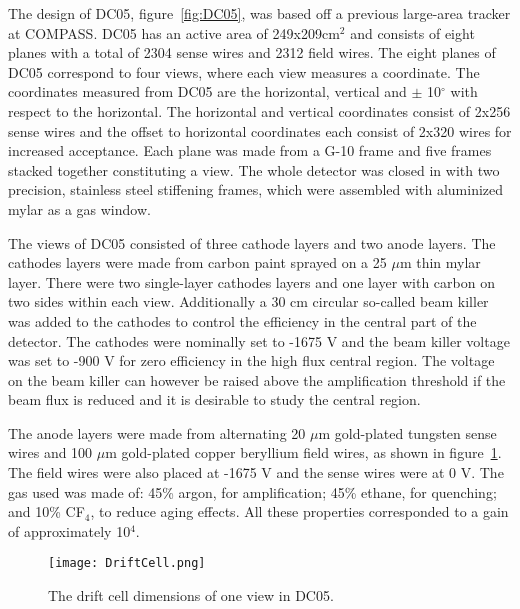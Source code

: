 \documentclass[aps,prl,twocolumn,groupedaddress]{revtex4-1}
\begin{document}
The design of DC05, figure~\ref{fig:DC05}, was based off a
previous large-area tracker at COMPASS.  DC05 has an
active area of 249x209cm$^2$ and consists of eight planes with a total
of 2304 sense wires and 2312 field wires.  The eight planes of DC05
correspond to four views, where each view measures a coordinate.  The
coordinates measured from DC05 are the horizontal, vertical and $\pm$
10$^{\circ}$ with respect to the horizontal.  The horizontal and
vertical coordinates consist of 2x256 sense wires and the offset to
horizontal coordinates each consist of 2x320 wires for increased
acceptance.  Each plane was made from a G-10 frame and five
frames stacked together constituting a view.  The whole detector was
closed in with two precision, stainless steel stiffening frames, which
were assembled with aluminized mylar as a gas window. \par The views
of DC05 consisted of three cathode layers and two anode
layers.  The cathodes layers were made from carbon paint sprayed on a
25 $\mu$m thin mylar layer.  There were two single-layer cathodes
layers and one layer with carbon on two sides within each view.
Additionally a 30 cm circular so-called beam killer was added to the cathodes to
control the efficiency in the central part of the detector.  The
cathodes were nominally set to -1675 V and the beam killer voltage was
set to -900 V for zero efficiency in the high flux central region.
The voltage on the beam killer can however be raised above the amplification threshold if the beam
flux is reduced and it is desirable to study the central region.  \par
The anode layers were made from alternating 20 $\mu$m gold-plated
tungsten sense wires and 100 $\mu$m gold-plated copper beryllium field
wires, as shown in figure~\ref{fig:driftcell}.  The field wires were
also placed at -1675 V and the sense wires were at 0 V.  The gas used
was made of: 45\% argon, for amplification; 45\% ethane, for
quenching; and 10\% CF$_4$, to reduce aging effects.  All these
properties corresponded to a gain of approximately 10$^4$.

\begin{figure}
  \centering
  \texttt{[image: DriftCell.png]}
  \caption{}{The drift cell dimensions of one view in DC05.}
  \label{fig:driftcell}%
\end{figure}
\end{document}
